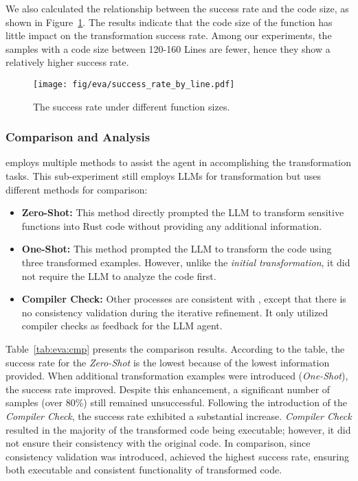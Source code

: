 We also calculated the relationship between the success rate and the code size, as shown in Figure~\ref{fig:eva:success}.
The results indicate that the code size of the function has little impact on the transformation success rate. 
Among our experiments, the samples with a code size between 120-160 Lines are fewer, hence they show a relatively higher success rate.

\begin{figure}[htb]
    \centering
    \texttt{[image: fig/eva/success\_rate\_by\_line.pdf]}
    \caption{The success rate under different function sizes.}
    \label{fig:eva:success}
\end{figure}



\subsubsection{Comparison and Analysis}
\system employs multiple methods to assist the agent in accomplishing the transformation tasks.
This sub-experiment still employs LLMs for transformation but uses different methods for comparison:
\begin{itemize}[leftmargin = *]
    \item \textbf{Zero-Shot:} This method directly prompted the LLM to transform sensitive functions into Rust code without providing any additional information.
    
    \item \textbf{One-Shot:} This method prompted the LLM to transform the code using three transformed examples. 
    However, unlike the \emph{initial transformation}, it did not require the LLM to analyze the code first.

    \item \textbf{Compiler Check:} Other processes are consistent with \system, except that there is no consistency validation during the iterative refinement.
    It only utilized compiler checks as feedback for the LLM agent.

\end{itemize}



Table~\ref{tab:eva:cmp} presents the comparison results.
According to the table, the success rate for the \textit{Zero-Shot} is the lowest because of the lowest information provided.
When additional transformation examples were introduced (\textit{One-Shot}), the success rate improved.
Despite this enhancement, a significant number of samples (over 80\%) still remained unsuccessful.
Following the introduction of the \textit{Compiler Check}, the success rate exhibited a substantial increase.
\textit{Compiler Check} resulted in the majority of the transformed code being executable; however, it did not ensure their consistency with the original code.
In comparison, since consistency validation was introduced, \system achieved the highest success rate, ensuring both executable and consistent functionality of transformed code.

